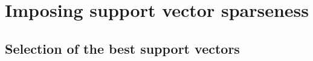 \documentclass[preprint,12pt]{elsarticle}
\begin{document}
%
%
%
%
%
%
%

\newpage
\section{Imposing support vector sparseness}

\subsection{Selection of the best support vectors}
\end{document}
